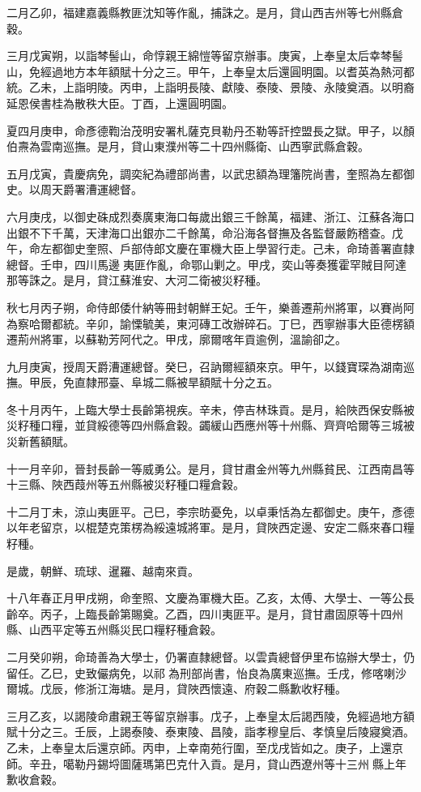 \begin{pinyinscope}
二月乙卯，福建嘉義縣教匪沈知等作亂，捕誅之。是月，貸山西吉州等七州縣倉穀。

三月戊寅朔，以詣棽髻山，命惇親王綿愷等留京辦事。庚寅，上奉皇太后幸棽髻山，免經過地方本年額賦十分之三。甲午，上奉皇太后還圓明園。以耆英為熱河都統。乙未，上詣明陵。丙申，上詣明長陵、獻陵、泰陵、景陵、永陵奠酒。以明裔延恩侯書桂為散秩大臣。丁酉，上還圓明園。

夏四月庚申，命彥德鞫治茂明安署札薩克貝勒丹丕勒等訐控盟長之獄。甲子，以顏伯燾為雲南巡撫。是月，貸山東濮州等二十四州縣衛、山西寧武縣倉穀。

五月戊寅，貴慶病免，調奕紀為禮部尚書，以武忠額為理籓院尚書，奎照為左都御史。以周天爵署漕運總督。

六月庚戌，以御史硃成烈奏廣東海口每歲出銀三千餘萬，福建、浙江、江蘇各海口出銀不下千萬，天津海口出銀亦二千餘萬，命沿海各督撫及各監督嚴飭稽查。戊午，命左都御史奎照、戶部侍郎文慶在軍機大臣上學習行走。己未，命琦善署直隸總督。壬申，四川馬邊夷匪作亂，命鄂山剿之。甲戌，奕山等奏獲霍罕賊目阿達那等誅之。是月，貸江蘇淮安、大河二衛被災籽種。

秋七月丙子朔，命侍郎倭什納等冊封朝鮮王妃。壬午，樂善遷荊州將軍，以賽尚阿為察哈爾都統。辛卯，諭慄毓美，東河磚工改辦碎石。丁巳，西寧辦事大臣德楞額遷荊州將軍，以蘇勒芳阿代之。甲戌，廓爾喀年貢逾例，溫諭卻之。

九月庚寅，授周天爵漕運總督。癸巳，召訥爾經額來京。甲午，以錢寶琛為湖南巡撫。甲辰，免直隸邢臺、阜城二縣被旱額賦十分之五。

冬十月丙午，上臨大學士長齡第視疾。辛未，停吉林珠貢。是月，給陜西保安縣被災籽種口糧，並貸綏德等四州縣倉穀。蠲緩山西應州等十州縣、齊齊哈爾等三城被災新舊額賦。

十一月辛卯，晉封長齡一等威勇公。是月，貸甘肅金州等九州縣貧民、江西南昌等十三縣、陜西葭州等五州縣被災籽種口糧倉穀。

十二月丁未，涼山夷匪平。己巳，李宗昉憂免，以卓秉恬為左都御史。庚午，彥德以年老留京，以棍楚克策楞為綏遠城將軍。是月，貸陜西定邊、安定二縣來春口糧籽種。

是歲，朝鮮、琉球、暹羅、越南來貢。

十八年春正月甲戌朔，命奎照、文慶為軍機大臣。乙亥，太傅、大學士、一等公長齡卒。丙子，上臨長齡第賜奠。乙酉，四川夷匪平。是月，貸甘肅固原等十四州縣、山西平定等五州縣災民口糧籽種倉穀。

二月癸卯朔，命琦善為大學士，仍署直隸總督。以雲貴總督伊里布協辦大學士，仍留任。乙巳，史致儼病免，以祁為刑部尚書，怡良為廣東巡撫。壬戌，修喀喇沙爾城。戊辰，修浙江海塘。是月，貸陜西懷遠、府穀二縣歉收籽種。

三月乙亥，以謁陵命肅親王等留京辦事。戊子，上奉皇太后謁西陵，免經過地方額賦十分之三。壬辰，上謁泰陵、泰東陵、昌陵，詣孝穆皇后、孝慎皇后陵寢奠酒。乙未，上奉皇太后還京師。丙申，上幸南苑行圍，至戊戌皆如之。庚子，上還京師。辛丑，噶勒丹錫埒圖薩瑪第巴克什入貢。是月，貸山西遼州等十三州縣上年歉收倉穀。


\end{pinyinscope}
